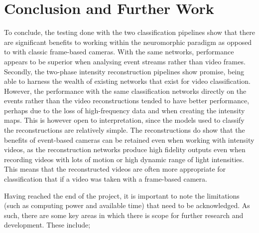 \chapter{Conclusion and Further Work} \label{chap:conclusion_and_further_work}

To conclude, the testing done with the two classification pipelines show that there are significant benefits to working within the neuromorphic paradigm as opposed to with classic frame-based cameras. With the same networks, performance appears to be superior when analysing event streams rather than video frames. Secondly, the two-phase intensity reconstruction pipelines show promise, being able to harness the wealth of existing networks that exist for video classification. However, the performance with the same classification networks directly on the events rather than the video reconstructions tended to have better performance, perhaps due to the loss of high-frequency data and when creating the intensity maps. This is however open to interpretation, since the models used to classify the reconstructions are relatively simple. The reconstructions do show that the benefits of event-based cameras can be retained even when working with intensity videos, as the reconstruction networks produce high fidelity outputs even when recording videos with lots of motion or high dynamic range of light intensities. This means that the reconstructed videos are often more appropriate for classification that if a video was taken with a frame-based camera.

Having reached the end of the project, it is important to note the limitations (such as computing power and available time) that need to be acknowledged. As such, there are some key areas in which there is scope for further research and development. These include;

